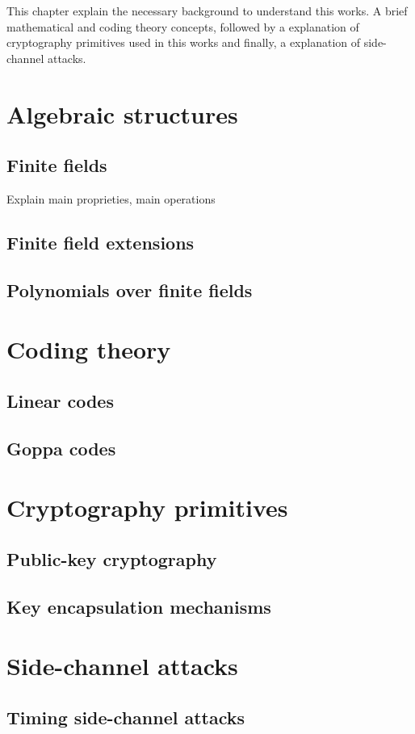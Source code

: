 This chapter explain the necessary background to understand this works. A brief mathematical and coding theory concepts, followed by a explanation of cryptography primitives used in this works and finally, a explanation of side-channel attacks.
\section{Algebraic structures}
\subsection{Finite fields}
Explain main proprieties, main operations
\subsection{Finite field extensions}

\subsection{Polynomials over finite fields}
\section{Coding theory}
\subsection{Linear codes}
\subsection{Goppa codes}
\section{Cryptography primitives}
\subsection{Public-key cryptography}
\subsection{Key encapsulation mechanisms}
\section{Side-channel attacks}
\subsection{Timing side-channel attacks}
